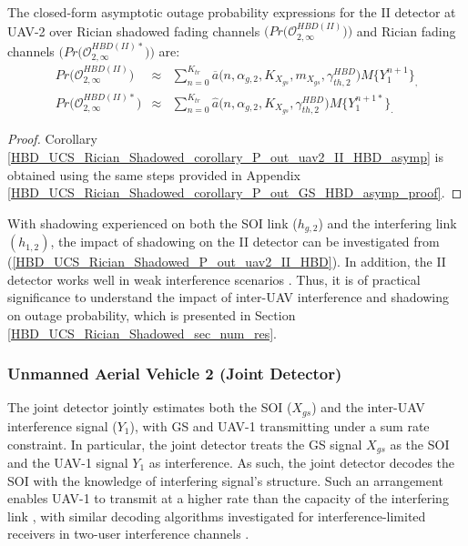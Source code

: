 \begin{corollary} \label{HBD_UCS_Rician_Shadowed_corollary_P_out_uav2_II_HBD_asymp}
The closed-form asymptotic outage probability expressions for the II detector at UAV-2 over Rician shadowed fading channels $\big(Pr\big(\mathcal{O}_{2,\infty}^{HBD(II)}\big)\big)$ and Rician fading channels $\big(Pr\big(\mathcal{O}_{2,\infty}^{HBD(II)*}\big)\big)$ are:
\begin{eqnarray} 
Pr\big(\mathcal{O}_{2,\infty}^{HBD(II)}\big) & \approx & \sum_{n=0}^{K_{tr}} \overline{a}\big(n,\alpha_{g,2},K_{X_{gs}},m_{X_{gs}},\gamma_{th,2}^{HBD}\big) M\{Y_1^{n+1}\}_, \label{HBD_UCS_Rician_Shadowed_P_out_uav2_II_HBD_asymp} \\
Pr\big(\mathcal{O}_{2,\infty}^{HBD(II)*}\big) & \approx & \sum_{n=0}^{K_{tr}} \widehat{a}\big(n,\alpha_{g,2},K_{X_{gs}},\gamma_{th,2}^{HBD}\big) M\{Y_1^{n+1*}\}_. \label{HBD_UCS_Rician_Shadowed_P_out_uav2_II_HBD_rician_asymp}
\end{eqnarray}
\end{corollary}
\begin{proof}
Corollary \ref{HBD_UCS_Rician_Shadowed_corollary_P_out_uav2_II_HBD_asymp} is obtained using the same steps provided in Appendix \ref{HBD_UCS_Rician_Shadowed_corollary_P_out_GS_HBD_asymp_proof}.
\end{proof}


With shadowing experienced on both the SOI link ($h_{g,2}$) and the interfering link $(h_{1,2})$, the impact of shadowing on the II detector can be investigated from (\ref{HBD_UCS_Rician_Shadowed_P_out_uav2_II_HBD}). In addition, the II detector works well in weak interference scenarios \cite{ernest2019outage}. Thus, it is of practical significance to understand the impact of inter-UAV interference and shadowing on outage probability, which is presented in Section \ref{HBD_UCS_Rician_Shadowed_sec_num_res}.

\subsubsection{Unmanned Aerial Vehicle 2 (Joint Detector)}
The joint detector jointly estimates both the SOI ($X_{gs}$) and the inter-UAV interference signal ($Y_1$), with GS and UAV-1 transmitting under a sum rate constraint. In particular, the joint detector treats the GS signal $X_{gs}$ as the SOI and the UAV-1 signal $Y_1$ as interference. As such, the joint detector decodes the SOI with the knowledge of interfering signal's structure. Such an arrangement enables UAV-1 to transmit at a higher rate than the capacity of the interfering link \cite{bennatan2014soft}, with similar decoding algorithms investigated for interference-limited receivers in two-user interference channels \cite{bandemer2012simultaneous,nam2014advanced}.

